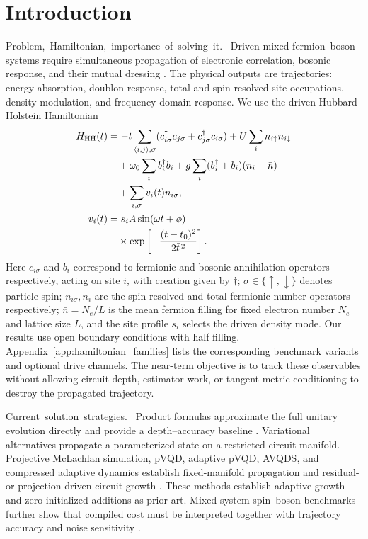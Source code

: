 \documentclass[
  reprint,
  amsmath,
  amssymb,
  aps,
  pra,
  nofootinbib,
  superscriptaddress,
  floatfix
]{revtex4-2}
\newcommand{\tentative}[1]{\textcolor{red!70!black}{#1}}
\newcommand{\structlabel}[1]{\noindent\mbox{\tentative{#1.}}~}
\begin{document}
\section{Introduction}

\structlabel{Problem, Hamiltonian, importance of solving it}
Driven mixed fermion--boson systems require simultaneous propagation of electronic correlation, bosonic response, and their mutual dressing \cite{Macridin2018,Macridin2018PRA,Sawaya2020,Li2023,Denner2023}.  The physical outputs are trajectories: energy absorption, doublon response, total and spin-resolved site occupations, density modulation, and frequency-domain response.  We use the driven Hubbard--Holstein Hamiltonian
\begin{align}
H_{\rm HH}(t)
&=-t\sum_{\langle i,j\rangle,\sigma}
(c_{i\sigma}^{\dagger}c_{j\sigma}+c_{j\sigma}^{\dagger}c_{i\sigma})
+U\sum_i n_{i\uparrow}n_{i\downarrow}
\nonumber\\
&\quad+\omega_0\sum_i b_i^\dagger b_i
+g\sum_i(b_i^\dagger+b_i)(n_i-\bar n)
\nonumber\\
&\quad+\sum_{i,\sigma}v_i(t)n_{i\sigma},
\nonumber\\
v_i(t)
&=s_i A\sin(\omega t+\phi)
\nonumber\\
&\quad\times
\exp\left[-\frac{(t-t_0)^2}{2\bar t^{\,2}}\right].
\label{eq:hubbard_holstein_driven}
\end{align}
Here \(c_{i\sigma}\) and \(b_i\) correspond to fermionic and bosonic annihilation operators respectively, acting on site $i$, with creation given by $\dagger$; $\sigma \in\{\uparrow, \downarrow\}$ denotes particle spin;
\(n_{i\sigma}, n_i\) are the spin-resolved and total fermionic number operators respectively; \(\bar n=N_e/L\) is the mean fermion filling
for fixed electron number \(N_e\) and lattice size \(L\), and the site profile \(s_i\) selects the driven density mode. Our results use open boundary conditions with half filling. Appendix~\ref{app:hamiltonian_families} lists the corresponding benchmark variants and optional drive channels.  The near-term objective is to track these observables without allowing circuit depth, estimator work, or tangent-metric conditioning to destroy the propagated trajectory.

\structlabel{Current solution strategies}
Product formulas approximate the full unitary evolution directly and provide a depth--accuracy baseline \cite{Suzuki1985,Suzuki1990,ChildsSu2019ProductFormula,ChildsOstranderSu2019RandomizedPF,Campbell2019QDRIFT}.  Variational alternatives propagate a parameterized state on a restricted circuit manifold.  Projective McLachlan simulation, pVQD, adaptive pVQD, AVQDS, and compressed adaptive dynamics establish fixed-manifold propagation and residual- or projection-driven circuit growth \cite{McLachlan1964,LiBenjamin2017VQS,Yuan2019VQS,Endo2020GeneralProcesses,Benedetti2021TimeEvolution,Barison2021,Yao2021,Linteau2024,Zhang2025}.  These methods establish adaptive growth and zero-initialized additions as prior art.  Mixed-system spin--boson benchmarks further show that compiled cost must be interpreted together with trajectory accuracy and noise sensitivity \cite{Miessen2021SpinBoson}.
\end{document}

